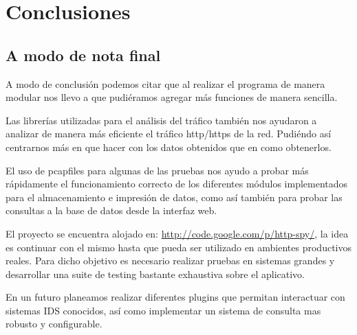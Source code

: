 \section{Conclusiones}

\subsection{A modo de nota final}

A modo de conclusión podemos citar que al realizar el programa de manera 
modular nos llevo a que pudiéramos agregar más funciones de manera sencilla. 

Las librerías utilizadas para el análisis del tráfico también nos ayudaron 
a analizar de manera más eficiente el tráfico http/https de la red. Pudiéndo 
así centrarnos más en que hacer con los datos obtenidos que en como obtenerlos.

El uso de pcapfiles para algunas de las pruebas nos ayudo a probar más rápidamente 
el funcionamiento correcto de los diferentes módulos implementados para el almacenamiento
e impresión de datos, como así también para probar las consultas a la base de datos 
desde la interfaz web.

El proyecto se encuentra alojado en: \url{http://code.google.com/p/http-spy/}, la idea es continuar con el mismo hasta que pueda ser utilizado en ambientes productivos reales. Para dicho objetivo es necesario realizar pruebas en sistemas grandes y desarrollar una suite de testing bastante exhaustiva sobre el aplicativo.

En un futuro planeamos realizar diferentes plugins que permitan interactuar con sistemas IDS conocidos, así como implementar un sistema de consulta mas robusto y configurable.